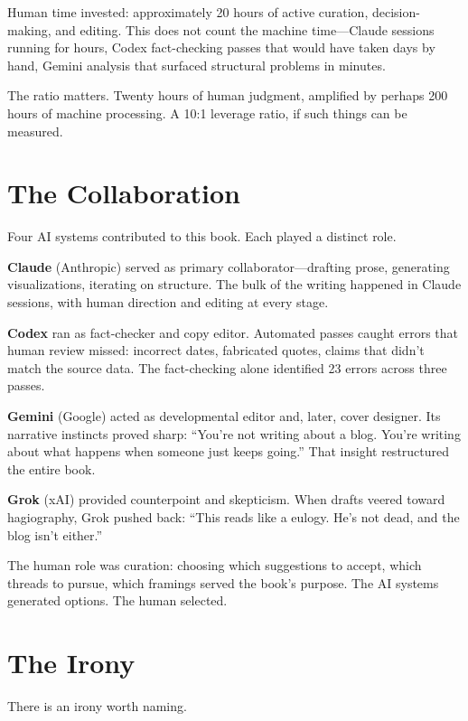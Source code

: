 Human time invested: approximately 20 hours of active curation, decision-making, and editing. This does not count the machine time---Claude sessions running for hours, Codex fact-checking passes that would have taken days by hand, Gemini analysis that surfaced structural problems in minutes.

The ratio matters. Twenty hours of human judgment, amplified by perhaps 200 hours of machine processing. A 10:1 leverage ratio, if such things can be measured.

\bigskip

\section*{The Collaboration}

Four AI systems contributed to this book. Each played a distinct role.

\textbf{Claude} (Anthropic) served as primary collaborator---drafting prose, generating visualizations, iterating on structure. The bulk of the writing happened in Claude sessions, with human direction and editing at every stage.

\textbf{Codex} ran as fact-checker and copy editor. Automated passes caught errors that human review missed: incorrect dates, fabricated quotes, claims that didn't match the source data. The fact-checking alone identified 23 errors across three passes.

\textbf{Gemini} (Google) acted as developmental editor and, later, cover designer. Its narrative instincts proved sharp: ``You're not writing about a blog. You're writing about what happens when someone just keeps going.'' That insight restructured the entire book.

\textbf{Grok} (xAI) provided counterpoint and skepticism. When drafts veered toward hagiography, Grok pushed back: ``This reads like a eulogy. He's not dead, and the blog isn't either.''

The human role was curation: choosing which suggestions to accept, which threads to pursue, which framings served the book's purpose. The AI systems generated options. The human selected.

\bigskip

\section*{The Irony}

There is an irony worth naming.

